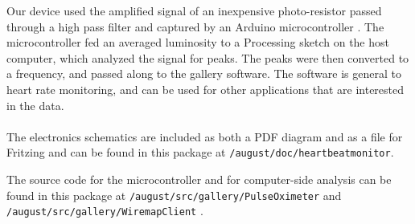 Our device used the amplified signal of an inexpensive photo-resistor passed through a high pass filter and captured by an Arduino microcontroller \cite{ARD}. The microcontroller fed an averaged luminosity to a Processing \cite{P5} sketch on the host computer, which analyzed the signal for peaks. The peaks were then converted to a frequency, and passed along to the gallery software. The software is general to heart rate monitoring, and can be used for other applications that are interested in the data.

\paragraph{}
The electronics schematics are included as both a PDF diagram and as a file for Fritzing\cite{FTZ} and can be found in this package at \texttt{/august/doc/heartbeatmonitor}.

The source code for the microcontroller and for computer-side analysis can be found in this package at \texttt{/august/src/gallery/PulseOximeter} and \texttt{/august/src/gallery/WiremapClient} \cite{PACK}.
